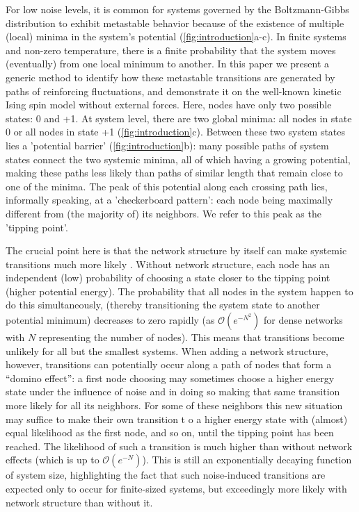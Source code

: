 \documentclass[a4paper, 11pt, twocolumn]{article}
\begin{document}
For low noise  levels, it is common for  systems governed by
the  Boltzmann-Gibbs  distribution   to  exhibit  metastable
behavior because of the existence of multiple (local) minima
in the system's potential (\cref{fig:introduction}{a-c}). In
finite systems  and non-zero temperature, there  is a finite
probability  that the  system  moves  (eventually) from  one
local minimum to another. In this paper we present a generic
method  to identify  how  these  metastable transitions  are
generated   by  paths   of  reinforcing   fluctuations,  and
demonstrate it  on the  well-known kinetic Ising  spin model
without external forces. Here,  nodes have only two possible
states:  0 and  +1. At  system level,  there are  two global
minima:  all nodes  in  state 0  or all  nodes  in state  +1
(\cref{fig:introduction}{c}).   Between  these   two  system
states        lies        a       'potential        barrier'
(\cref{fig:introduction}{b}): many possible  paths of system
states connect the two systemic  minima, all of which having
a  growing potential,  making these  paths less  likely than
paths  of similar  length that  remain close  to one  of the
minima. The peak of this  potential along each crossing path
lies, informally speaking, at a 'checkerboard pattern': each
node being  maximally different  from (the majority  of) its
neighbors. We refer to this peak as the 'tipping point'.

The  crucial point  here is  that the  network structure  by
itself  can  make  systemic  transitions  much  more  likely
\cite{Harush2017a,Gao2016,Wunderling2020,Wunderling2021}.
Without  network structure,  each  node  has an  independent
(low) probability of choosing a  state closer to the tipping
point (higher  potential energy).  The probability  that all
nodes  in  the  system  happen to  do  this  simultaneously,
(thereby transitioning the system state to another potential
minimum)     decreases      to     zero      rapidly     (as
\(\mathcal{O}(e^{-N^2})\)  for   dense  networks   with  \(N\)
representing  the   number  of   nodes).  This   means  that
transitions  become  unlikely  for   all  but  the  smallest
systems.   When  adding   a   network  structure,   however,
transitions can potentially occur along a path of nodes that
form a ``domino effect'': a  first node choosing may sometimes
choose a  higher energy state  under the influence  of noise
and in doing so making  that same transition more likely for
all  its neighbors.  For some  of these  neighbors this  new
situation may  suffice to  make their own  transition t  o a
higher energy  state with  (almost) equal likelihood  as the
first  node, and  so on,  until the  tipping point  has been
reached. The likelihood of such  a transition is much higher
than   without    network   effects   (which   is    up   to
\(\mathcal{O}(e^{-N})\)).  This  is still  an  exponentially
decaying function of system size, highlighting the fact that
such noise-induced  transitions are  expected only  to occur
for finite-sized  systems, but exceedingly more  likely with
network structure than without it.
\end{document}
